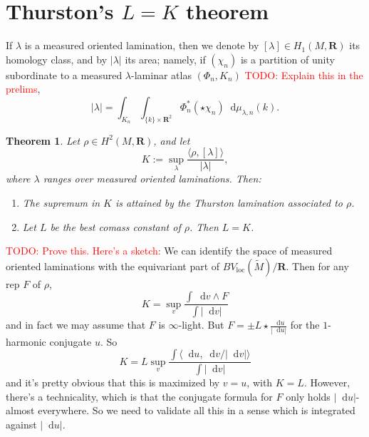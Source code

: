 \documentclass[reqno,11pt]{amsart}
\newcommand{\RR}{\mathbf{R}}
\newcommand*\dif{\mathop{}\!\mathrm{d}}
\newcommand{\loc}{\mathrm{loc}}
\newtheorem{theorem}{Theorem}[section]
\theoremstyle{definition}
\numberwithin{equation}{section}
\newcommand\todo[1]{\textcolor{red}{TODO: #1}}
\begin{document}
\section{Thurston's \texorpdfstring{$L = K$}{L equals K} theorem}
If $\lambda$ is a measured oriented lamination, then we denote by $[\lambda] \in H_1(M, \RR)$ its homology class, and by $|\lambda|$ its area; namely, if $(\chi_n)$ is a partition of unity subordinate to a measured $\lambda$-laminar atlas $(\Phi_n, K_n)$ \todo{Explain this in the prelims},
$$|\lambda| = \int_{K_n} \int_{\{k\} \times \RR^2} \Phi_n^*(\star \chi_n) \dif \mu_{\lambda, n}(k).$$

\begin{theorem}
	Let $\rho \in H^2(M, \RR)$, and let 
	$$K := \sup_\lambda \frac{\langle \rho, [\lambda]\rangle}{|\lambda|},$$
	where $\lambda$ ranges over measured oriented laminations. Then:
\begin{enumerate}
	\item The supremum in $K$ is attained by the Thurston lamination associated to $\rho$.
	\item Let $L$ be the best comass constant of $\rho$. Then $L = K$.
\end{enumerate}
\end{theorem}

\todo{Prove this. Here's a sketch:}
We can identify the space of measured oriented laminations with the equivariant part of $BV_\loc(\tilde M)/\RR$.
Then for any rep $F$ of $\rho$,
$$K = \sup_v \frac{\int \dif v \wedge F}{\int |\dif v|}$$
and in fact we may assume that $F$ is $\infty$-light.
But $F = \pm L \star \frac{\dif u}{|\dif u|}$ for the $1$-harmonic conjugate $u$.
So 
$$K = L \sup_v \frac{\int \langle \dif u, \dif v/|\dif v|\rangle}{\int |\dif v|}$$
and it's pretty obvious that this is maximized by $v = u$, with $K = L$.
However, there's a technicality, which is that the conjugate formula for $F$ only holds $|\dif u|$-almost everywhere.
So we need to validate all this in a sense which is integrated against $|\dif u|$.

\printbibliography
\end{document}
